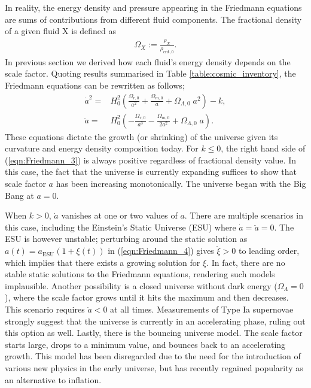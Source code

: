 In reality, the energy density and pressure appearing in the Friedmann equations are sums of contributions from different fluid components. The fractional density of a given fluid X is defined as
\begin{align}
	\Omega_X := \frac{\rho_X}{\rho_{\text{crit},0}}.
\end{align}
In previous section we derived how each fluid's energy density depends on the scale factor. Quoting results summarised in Table \ref{table:cosmic_inventory}, the Friedmann equations can be rewritten as follows;
\begin{align}
	\dot{a}^2 =& H_0^2 \left( \frac{\Omega_{r,0}}{a^2} + \frac{\Omega_{m,0}}{a} + \Omega_{\Lambda,0} \; a^2 \right) - k, \label{eqn:Friedmann_3}\\
	\ddot{a} =& H_0^2 \left( - \frac{\Omega_{r,0}}{a^3} - \frac{\Omega_{m,0}}{2a^2} + \Omega_{\Lambda,0} \; a \right). \label{eqn:Friedmann_4}
\end{align}
These equations dictate the growth (or shrinking) of the universe given its curvature and energy density composition today. For $k \le 0$, the right hand side of (\ref{eqn:Friedmann_3}) is always positive regardless of fractional density value. In this case, the fact that the universe is currently expanding suffices to show that scale factor $a$ has been increasing monotonically. The universe began with the Big Bang at $a=0$.

When $k > 0$, $\dot{a}$ vanishes at one or two values of $a$. There are multiple scenarios in this case, including the Einstein's Static Universe (ESU) where $\dot{a} = \ddot{a} = 0$. The ESU is however unstable; perturbing around the static solution as $a(t)=a_{\text{ESU}}(1+\xi(t))$ in (\ref{eqn:Friedmann_4}) gives $\ddot{\xi}>0$ to leading order, which implies that there exists a growing solution for $\xi$. In fact, there are no stable static solutions to the Friedmann equations, rendering such models implausible. Another possibility is a closed universe without dark energy ($\Omega_\Lambda = 0$), where the scale factor grows until it hits the maximum and then decreases. This scenario requires $\ddot{a}<0$ at all times. Measurements of Type Ia supernovae strongly suggest that the universe is currently in an accelerating phase, ruling out this option as well. Lastly, there is the bouncing universe model. The scale factor starts large, drops to a minimum value, and bounces back to an accelerating growth. This model has been disregarded due to the need for the introduction of various new physics in the early universe, but has recently regained popularity as an alternative to inflation.

